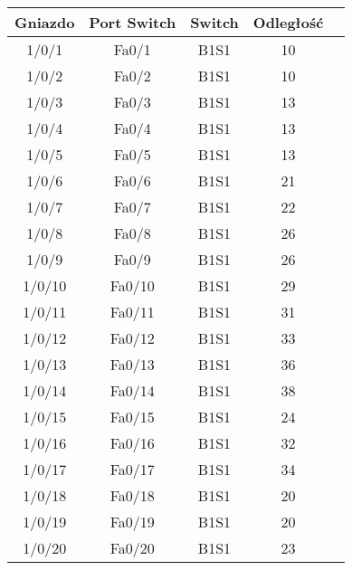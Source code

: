 \begin{center}
    \begin{longtable}{|c|c|c|c|c|}
    \hline
    Gniazdo & Port Switch & Switch & Odległość \\ \hline
	1/0/1 & Fa0/1 & B1S1 & 10 \\ \hline
	1/0/2 & Fa0/2 & B1S1 & 10 \\ \hline
	1/0/3 & Fa0/3 & B1S1 & 13 \\ \hline
	1/0/4 & Fa0/4 & B1S1 & 13 \\ \hline
	1/0/5 & Fa0/5 & B1S1 & 13 \\ \hline
	1/0/6 & Fa0/6 & B1S1 & 21 \\ \hline
	1/0/7 & Fa0/7 & B1S1 & 22 \\ \hline
	1/0/8 & Fa0/8 & B1S1 & 26 \\ \hline
	1/0/9 & Fa0/9 & B1S1 & 26 \\ \hline
	1/0/10 & Fa0/10 & B1S1 & 29 \\ \hline
	1/0/11 & Fa0/11 & B1S1 & 31 \\ \hline
	1/0/12 & Fa0/12 & B1S1 & 33 \\ \hline
	1/0/13 & Fa0/13 & B1S1 & 36 \\ \hline
	1/0/14 & Fa0/14 & B1S1 & 38 \\ \hline
	1/0/15 & Fa0/15 & B1S1 & 24 \\ \hline
	1/0/16 & Fa0/16 & B1S1 & 32 \\ \hline
	1/0/17 & Fa0/17 & B1S1 & 34 \\ \hline
	1/0/18 & Fa0/18 & B1S1 & 20 \\ \hline
	1/0/19 & Fa0/19 & B1S1 & 20 \\ \hline
	1/0/20 & Fa0/20 & B1S1 & 23 \\ \hline

    \end{longtable}
\end{center}

